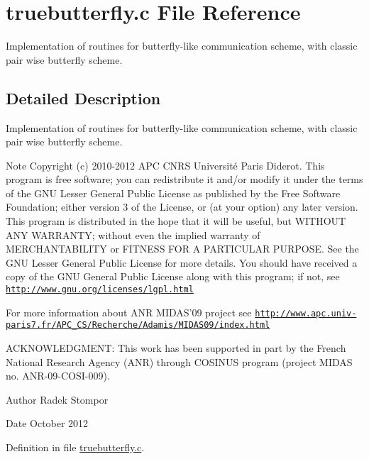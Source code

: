 \section{truebutterfly.\-c File Reference}
\label{truebutterfly_8c}


Implementation of routines for butterfly-\/like communication scheme, with classic pair wise butterfly scheme.  




\subsection{Detailed Description}
Implementation of routines for butterfly-\/like communication scheme, with classic pair wise butterfly scheme. \begin{DoxyNote}{Note}
Copyright (c) 2010-\/2012 A\-P\-C C\-N\-R\-S Université Paris Diderot. This program is free software; you can redistribute it and/or modify it under the terms of the G\-N\-U Lesser General Public License as published by the Free Software Foundation; either version 3 of the License, or (at your option) any later version. This program is distributed in the hope that it will be useful, but W\-I\-T\-H\-O\-U\-T A\-N\-Y W\-A\-R\-R\-A\-N\-T\-Y; without even the implied warranty of M\-E\-R\-C\-H\-A\-N\-T\-A\-B\-I\-L\-I\-T\-Y or F\-I\-T\-N\-E\-S\-S F\-O\-R A P\-A\-R\-T\-I\-C\-U\-L\-A\-R P\-U\-R\-P\-O\-S\-E. See the G\-N\-U Lesser General Public License for more details. You should have received a copy of the G\-N\-U General Public License along with this program; if not, see \href{http://www.gnu.org/licenses/lgpl.html}{\tt http\-://www.\-gnu.\-org/licenses/lgpl.\-html} 

For more information about A\-N\-R M\-I\-D\-A\-S'09 project see \href{http://www.apc.univ-paris7.fr/APC_CS/Recherche/Adamis/MIDAS09/index.html}{\tt http\-://www.\-apc.\-univ-\/paris7.\-fr/\-A\-P\-C\-\_\-\-C\-S/\-Recherche/\-Adamis/\-M\-I\-D\-A\-S09/index.\-html} 

A\-C\-K\-N\-O\-W\-L\-E\-D\-G\-M\-E\-N\-T\-: This work has been supported in part by the French National Research Agency (A\-N\-R) through C\-O\-S\-I\-N\-U\-S program (project M\-I\-D\-A\-S no. A\-N\-R-\/09-\/\-C\-O\-S\-I-\/009). 
\end{DoxyNote}
\begin{DoxyAuthor}{Author}
Radek Stompor 
\end{DoxyAuthor}
\begin{DoxyDate}{Date}
October 2012 
\end{DoxyDate}


Definition in file \hyperlink{truebutterfly_8c_source}{truebutterfly.\-c}.

